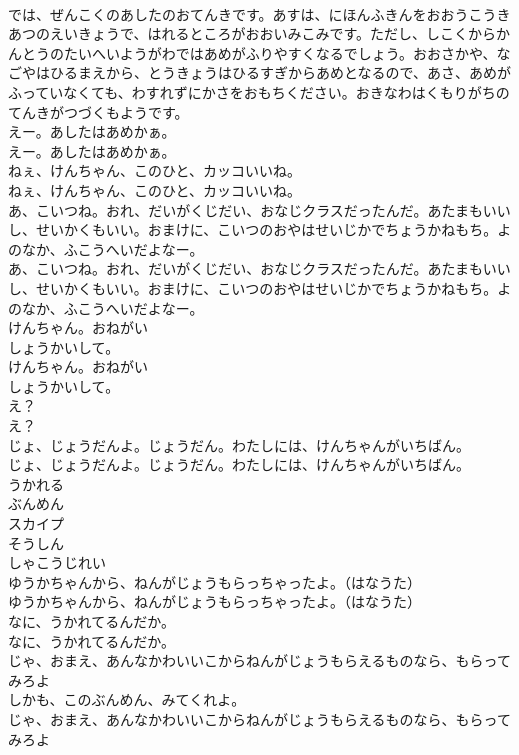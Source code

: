 \documentclass[8pt]{extreport}
\begin{document}
\begin{CJK}{UTF8}{min}
\\	では、ぜんこくのあしたのおてんきです。あすは、にほんふきんをおおうこうきあつのえいきょうで、はれるところがおおいみこみです。ただし、しこくからかんとうのたいへいようがわではあめがふりやすくなるでしょう。おおさかや、なごやはひるまえから、とうきょうはひるすぎからあめとなるので、あさ、あめがふっていなくても、わすれずにかさをおもちください。おきなわはくもりがちのてんきがつづくもようです。
\\	えー。あしたはあめかぁ。
\\	えー。あしたはあめかぁ。
\\	ねぇ、けんちゃん、このひと、カッコいいね。
\\	ねぇ、けんちゃん、このひと、カッコいいね。
\\	あ、こいつね。おれ、だいがくじだい、おなじクラスだったんだ。あたまもいいし、せいかくもいい。おまけに、こいつのおやはせいじかでちょうかねもち。よのなか、ふこうへいだよなー。
\\	あ、こいつね。おれ、だいがくじだい、おなじクラスだったんだ。あたまもいいし、せいかくもいい。おまけに、こいつのおやはせいじかでちょうかねもち。よのなか、ふこうへいだよなー。
\\	けんちゃん。おねがい
\\	しょうかいして。
\\	けんちゃん。おねがい
\\	しょうかいして。
\\	え？
\\	え？
\\	じょ、じょうだんよ。じょうだん。わたしには、けんちゃんがいちばん。
\\	じょ、じょうだんよ。じょうだん。わたしには、けんちゃんがいちばん。
\\	うかれる
\\	ぶんめん
\\	スカイプ
\\	そうしん
\\	しゃこうじれい
\\	ゆうかちゃんから、ねんがじょうもらっちゃったよ。（はなうた）
\\	ゆうかちゃんから、ねんがじょうもらっちゃったよ。（はなうた）
\\	なに、うかれてるんだか。
\\	なに、うかれてるんだか。
\\	じゃ、おまえ、あんなかわいいこからねんがじょうもらえるものなら、もらってみろよ
\\	しかも、このぶんめん、みてくれよ。
\\	じゃ、おまえ、あんなかわいいこからねんがじょうもらえるものなら、もらってみろよ

\end{CJK}
\end{document}
